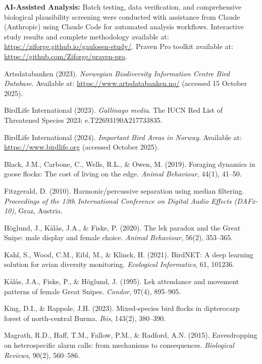 \documentclass[twocolumn]{article}
\begin{document}
\textbf{AI-Assisted Analysis:} Batch testing, data verification, and comprehensive biological plausibility screening were conducted with assistance from Claude (Anthropic) using Claude Code for automated analysis workflows. Interactive study results and complete methodology available at: \url{https://ziforge.github.io/gaulosen-study/}. Praven Pro toolkit available at: \url{https://github.com/Ziforge/praven-pro}.


\begin{thebibliography}{99}

 Artsdatabanken (2023). \textit{Norwegian Biodiversity Information Centre Bird Database}. Available at: \url{https://www.artsdatabanken.no/} (accessed 15 October 2025).

 BirdLife International (2023). \textit{Gallinago media}. The IUCN Red List of Threatened Species 2023: e.T22693190A217733835.

 BirdLife International (2024). \textit{Important Bird Areas in Norway}. Available at: \url{https://www.birdlife.org} (accessed October 2025).

 Black, J.M., Carbone, C., Wells, R.L., \& Owen, M. (2019). Foraging dynamics in goose flocks: The cost of living on the edge. \textit{Animal Behaviour}, 44(1), 41--50.

 Fitzgerald, D. (2010). Harmonic/percussive separation using median filtering. \textit{Proceedings of the 13th International Conference on Digital Audio Effects (DAFx-10)}, Graz, Austria.

 Höglund, J., Kålås, J.A., \& Fiske, P. (2020). The lek paradox and the Great Snipe: male display and female choice. \textit{Animal Behaviour}, 56(2), 353--365.

 Kahl, S., Wood, C.M., Eibl, M., \& Klinck, H. (2021). BirdNET: A deep learning solution for avian diversity monitoring. \textit{Ecological Informatics}, 61, 101236.

 Kålås, J.A., Fiske, P., \& Höglund, J. (1995). Lek attendance and movement patterns of female Great Snipes. \textit{Condor}, 97(4), 895--905.

 King, D.I., \& Rappole, J.H. (2023). Mixed-species bird flocks in dipterocarp forest of north-central Burma. \textit{Ibis}, 143(2), 380--390.

 Magrath, R.D., Haff, T.M., Fallow, P.M., \& Radford, A.N. (2015). Eavesdropping on heterospecific alarm calls: from mechanisms to consequences. \textit{Biological Reviews}, 90(2), 560--586.


\end{thebibliography}
\end{document}
